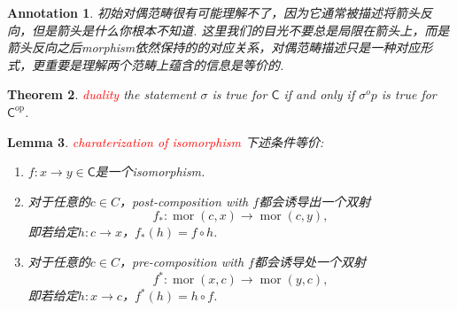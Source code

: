 \documentclass{article}
\newtheorem{theorem}{Theorem}[section]
\newtheorem{lemma}[theorem]{Lemma}
\newtheorem{annotation}[theorem]{Annotation}
\newcommand*{\cat}[1]{\textsf{#1}\xspace}
\newcommand{\op}{\textrm{op}}
\newcommand*{\xfunc}[4]{{#2}\colon{#3}{#1}{#4}}
\newcommand*{\func}[3]{\xfunc{\to}{#1}{#2}{#3}}
\DeclareMathOperator{\mor}{mor}
\newcommand{\redt}[1]{\textcolor{red}{#1}}
\begin{document}
\begin{annotation}
\rm 初始对偶范畴很有可能理解不了，因为它通常被描述将箭头反向，但是箭头是什么你根本不知道. 这里我们的目光不要总是局限在箭头上，而是箭头反向之后morphism依然保持的的对应关系，对偶范畴描述只是一种对应形式，更重要是理解两个范畴上蕴含的信息是等价的. 
\end{annotation}

\begin{theorem}
\rm \redt{duality} the statement $\sigma$ is true for $\cat{C}$ if and only if $\sigma^op$ is true for $\cat{C}^\op$. 
\end{theorem}

\begin{lemma}
\rm \redt{charaterization of isomorphism} 下述条件等价:
\begin{enumerate}
	\item $\func{f}{x}{y} \in \cat{C}$是一个isomorphism.
	\item 对于任意的$c \in C$，post-composition with $f$都会诱导出一个双射
	$$
	\func{f_*}{\mor(c,x)}{\mor(c,y)},
	$$
	即若给定$\func{h}{c}{x}$，$f_*(h) = f \circ h$.
	\item 对于任意的$c \in C$，pre-composition with $f$都会诱导处一个双射
	$$
	\func{f^*}{\mor(x,c)}{\mor(y,c)},
	$$
	即若给定$\func{h}{x}{c}$，$f^*(h) = h \circ f$.  
\end{enumerate}
\end{lemma}
\end{document}
